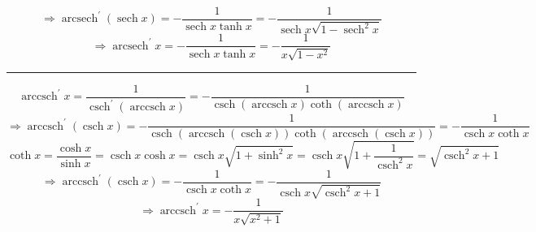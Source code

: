 \documentclass[a0paper,landscape,fleqn]{article}
\DeclareMathOperator{\sech}{sech}
\DeclareMathOperator{\csch}{csch}
\DeclareMathOperator{\arcsech}{arcsech}
\DeclareMathOperator{\arccsch}{arccsch}
\begin{document}
\begin{equation*}
\Rightarrow\arcsech^\prime(\sech x)
=-\frac{1}{\sech x\tanh x}
=-\frac{1}{\sech x\sqrt{1-\sech^2 x}}
\end{equation*}
\begin{equation*}
\Rightarrow\arcsech^\prime x
=-\frac{1}{\sech x\tanh x}
=-\frac{1}{x\sqrt{1-x^2}}
\end{equation*}
\hrule
\begin{equation*}
\arccsch^\prime x
=\frac{1}{\csch^\prime(\arccsch x)}
=-\frac{1}{\csch(\arccsch x)\coth(\arccsch x)}
\end{equation*}
\begin{equation*}
\Rightarrow\arccsch^\prime(\csch x)
=-\frac{1}{\csch(\arccsch(\csch x))\coth(\arccsch(\csch x))}
=-\frac{1}{\csch x\coth x}
\end{equation*}
\begin{equation*}
\coth x
=\frac{\cosh x}{\sinh x}
=\csch x\cosh x
=\csch x\sqrt{1+\sinh^2 x}
=\csch x\sqrt{1+\frac{1}{\csch^2 x}}
=\sqrt{\csch^2 x+1}
\end{equation*}
\begin{equation*}
\Rightarrow\arccsch^\prime(\csch x)
=-\frac{1}{\csch x\coth x}
=-\frac{1}{\csch x\sqrt{\csch^2 x+1}}
\end{equation*}
\begin{equation*}
\Rightarrow\arccsch^\prime x
=-\frac{1}{x\sqrt{x^2+1}}
\end{equation*}
\end{document}
